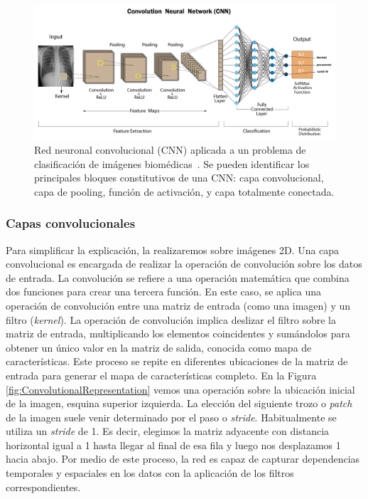 \begin{figure}[htp]
  \centering
  \includegraphics[width=\textwidth]{imagenes/chapter2/RadiographyConvolutionExample.png}
  \caption[Ejemplo de red convolucional para imágenes médicas.]{
    Red neuronal convolucional (CNN) aplicada a un problema de clasificación de imágenes biomédicas~\cite{RadiographyConvolutionExample}.
    Se pueden identificar los principales bloques constitutivos de una CNN: capa convolucional, 
    capa de pooling, función de activación, y capa totalmente conectada.
  }
  \label{fig:RadiographyConvolutionExample}
\end{figure}

\subsubsection{Capas convolucionales}
Para simplificar la explicación, la realizaremos sobre imágenes 2D. 
Una capa convolucional es encargada de realizar la operación de convolución sobre 
los datos de entrada. 
La convolución se refiere a una operación matemática que combina dos funciones para crear una tercera función.
En este caso, se aplica una operación de convolución 
entre una matriz de entrada (como una imagen) y un filtro (\emph{kernel}).
La operación de convolución implica deslizar el filtro sobre la matriz de entrada, 
multiplicando los elementos coincidentes y sumándolos para obtener un único valor 
en la matriz de salida, conocida como mapa de características. 
Este proceso se repite en diferentes ubicaciones de la matriz de 
entrada para generar el mapa de características completo. En la Figura 
\ref{fig:ConvolutionalRepresentation} vemos una operación sobre la ubicación 
inicial de la imagen, esquina superior izquierda. 
La elección del siguiente trozo 
o \emph{patch} de la imagen suele venir determinado por el paso o \emph{stride}.
Habitualmente se utiliza un \emph{stride} de 1. Es decir, elegimos la matriz 
adyacente con distancia horizontal igual a 1 hasta llegar al final de esa fila 
y luego nos desplazamos 1 hacia abajo. 
Por medio de este proceso, la red es capaz de
capturar dependencias temporales y espaciales en los datos con la aplicación
de los filtros correspondientes.

